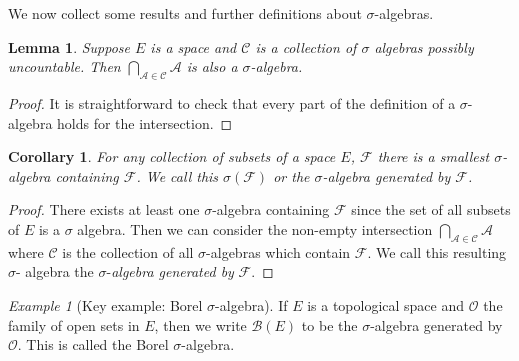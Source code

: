\documentclass[11pt]{article}
\newtheorem{cor}[thm]{Corollary}
\newtheorem{lem}[thm]{Lemma}
\theoremstyle{definition}
\theoremstyle{remark}
\newtheorem{ex}[thm]{Example}
\begin{document}
We now collect some results and further definitions about $\sigma$-algebras.
\begin{lem}
Suppose $E$ is a space and $\mathcal{C}$ is a collection of $\sigma$ algebras possibly uncountable. Then $\bigcap_{\mathcal{A} \in \mathcal{C}} \mathcal{A}$ is also a $\sigma$-algebra.
\end{lem}
\begin{proof}
It is straightforward to check that every part of the definition of a $\sigma$-algebra holds for the intersection.
\end{proof}
\begin{cor}
For any collection of subsets of a space $E$, $\mathcal{F}$ there is a smallest $\sigma$-algebra containing $\mathcal{F}$. We call this $\sigma(\mathcal{F})$ or the $\sigma$-algebra generated by $\mathcal{F}$.
\end{cor}
\begin{proof}
There exists at least one $\sigma$-algebra containing $\mathcal{F}$ since the set of all subsets of $E$ is a $\sigma$ algebra. Then we can consider the non-empty intersection $\bigcap_{\mathcal{A} \in \mathcal{C}} \mathcal{A}$ where $\mathcal{C}$ is the collection of all $\sigma$-algebras which contain $\mathcal{F}$. We call this resulting $\sigma$- algebra the $\sigma$-\emph{algebra generated by} $\mathcal{F}$.
\end{proof}

\begin{ex}[Key example: Borel $\sigma$-algebra]
If $E$ is a topological space and $\mathcal{O}$ the family of open sets in $E$, then we write $\mathcal{B}(E)$ to be the $\sigma$-algebra generated by $\mathcal{O}$. This is called the Borel $\sigma$-algebra.
\end{ex}
\end{document}

